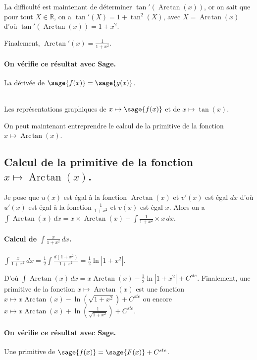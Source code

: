 \documentclass[a4paper,12pt]{report}
\def\eclaire{\mathbb}
\def\R{\ensuremath{\eclaire R}}
\renewcommand{\arctan}{\mathop{\mathrm{Arc\mspace{2mu}tan}}}
\begin{document}
La difficulté est maintenant de déterminer $\tan'(\arctan(x))$, or on sait que pour tout $X \in \R$, on a $ \tan'(X) =1+\tan^2(X) $, avec $X= \arctan(x)$ d'où $\tan'(\arctan(x)) = 1+x^2$.

Finalement, $\arctan\nolimits'(x) = \frac{1}{1+x^2}$.
\paragraph{On vérifie ce résultat avec Sage.}
La dérivée de $\sage{f(x)} = \sage{g(x)} $.

\begin{center}
\\
Les représentations graphiques de $x \mapsto \sage{f(x)} $ et de $x\mapsto \tan(x)$.
\end{center}
On peut maintenant entreprendre le calcul de la primitive de la  fonction  $x \mapsto \arctan(x) $.


\subsection{Calcul de la primitive de la fonction  $x \mapsto \arctan(x) $.}
Je pose que $u(x)$  est égal à la fonction $\arctan(x)$ et $v'(x)$ est égal $dx$  d'où $u'(x)$  est égal à la fonction $ \frac{1}{1+ x^2} $ et $v(x)$ est égal $x$.
Alors on a $\int \arctan(x) \, dx = x \times \arctan(x) -\int \frac{1}{1+x^2} \times x \, dx $.

\paragraph{Calcul de $\int \frac{x}{1+ x^2} \, dx $.}
$\int \frac{x}{1+ x^2} \, dx = \frac{1}{2} \int \frac{d(1+x^2)}{1+ x^2} = \frac{1}{2} \ln \left| 1+ x^2 \right| $.

D'où $\int \arctan(x) \, dx = x \arctan(x) - \frac{1}{2} \ln \left| 1+ x^2 \right| + C^{ste} $. 
Finalement, une primitive de la fonction $x \mapsto \arctan(x) $ est une fonction $x \mapsto x \arctan(x) -\ln\left( \sqrt{1+ x^2}\right) + C^{ste} $ ou encore $x \mapsto x \arctan(x) +\ln\left( \frac{1}{\sqrt{1+ x^2}}\right) + C^{ste} $.
\paragraph{On vérifie ce résultat avec Sage.}
Une primitive de $\sage{f(x)} = \sage{F(x)} + C^{ste}$.
\end{document}
